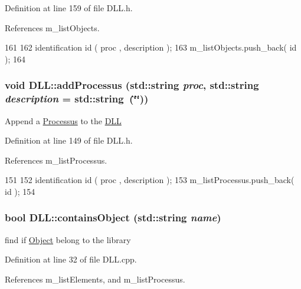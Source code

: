 Definition at line 159 of file DLL.h.

References m\_\-listObjects.


\begin{DoxyCode}
161     {
162     identification id ( proc , description ); 
163     m_listObjects.push_back( id );
164   }
\end{DoxyCode}
\hypertarget{classDLL_a1f08b909c1569631b6b6b84b52409e33}{
\subsubsection[{addProcessus}]{\setlength{\rightskip}{0pt plus 5cm}void DLL::addProcessus (std::string {\em proc}, \/  std::string {\em description} = {\ttfamily std::string~(\char`\"{}\char`\"{})})}}
\label{classDLL_a1f08b909c1569631b6b6b84b52409e33}
Append a \hyperlink{classProcessus}{Processus} to the \hyperlink{classDLL}{DLL} 

Definition at line 149 of file DLL.h.

References m\_\-listProcessus.


\begin{DoxyCode}
151     {
152     identification id ( proc , description ); 
153     m_listProcessus.push_back( id );
154   }
\end{DoxyCode}
\hypertarget{classDLL_af1aada8b1d5632bfac61639f997b9753}{
\subsubsection[{containsObject}]{\setlength{\rightskip}{0pt plus 5cm}bool DLL::containsObject (std::string {\em name})}}
\label{classDLL_af1aada8b1d5632bfac61639f997b9753}
find if \hyperlink{classObject}{Object} belong to the library 

Definition at line 32 of file DLL.cpp.

References m\_\-listElements, and m\_\-listProcessus.


